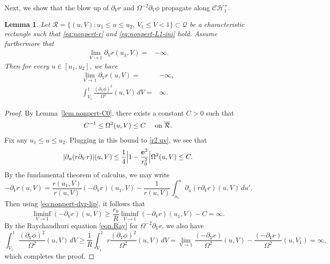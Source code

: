 \documentclass[10pt, reqno]{amsart}
\newtheorem{lemma}[theorem]{Lemma}
\theoremstyle{definition}
\theoremstyle{remark}
\numberwithin{equation}{section}
\newcommand{\abs}[1]{\vert#1\vert}
\newcommand{\set}[1]{\{#1\}}
\newcommand{\ud}{d}
\newcommand{\rd}{\partial}
\newcommand{\bb}{\Big}
\newcommand{\0}{\emptyset}
\newcommand{\Omg}{\Omega}
\newcommand{\bfe}{{\bf e}}
\newcommand{\calC}{\mathcal C}
\newcommand{\calH}{\mathcal H}
\newcommand{\calQ}{\mathcal Q}
\newcommand{\calR}{\mathcal R}
\newcommand{\CH}{\calC \calH^{+}}		%
\begin{document}
Next, we show that the blow up of $\rd_{V} r$ and $\Omg^{-2} \rd_{V} \phi$ propagate along $\CH_{1}$.
\begin{lemma} \label{lem.nonpert-blowup}
Let $\calR = \set{(u, V) : u_{1} \leq u \leq u_{2}, \ V_{1} \leq V < 1} \subset \calQ$ be a characteristic rectangle such that \eqref{eq:nonpert-r} and \eqref{eq:nonpert-L1-ini} hold. Assume furthermore that
\begin{align*}
	\lim_{V \to 1} \rd_{V} r(u_{1}, V) =& -\infty.
\end{align*}
Then for every $u \in [u_{1}, u_{2}]$, we have
\begin{align*}
	\lim_{V \to 1} \rd_{V} r(u, V) =& -\infty, \\
	\int_{V_{1}}^{1} \frac{(\rd_{V} \phi)^{2}}{\Omg^{2}}(u, V) \, d V =& \infty.
\end{align*}
\end{lemma}
\begin{proof}
By Lemma~\ref{lem.nonpert-C0}, there exists a constant $C > 0$ such that
\begin{equation*}
	C^{-1} \leq \Omg^{2}(u, V) \leq C \quad \hbox{ on } \overline{\mathcal R}.
\end{equation*}
Fix any $u_{1} \leq u \leq u_{2}$. Plugging in this bound to \eqref{r2.uv}, we see that
\begin{equation} \label{eq:nonpert-dvr-lip}
\abs{\rd_{u} (r \rd_{V} r)}(u, V)
\leq \frac{1}{4} \bb| 1 - \frac{\bfe^{2}}{r_{0}^{2}} \bb| \Omg^{2}(u, V) \leq C.
\end{equation}
By the fundamental theorem of calculus, we may write
\begin{equation*}
	- \rd_{V} r(u, V) = \frac{r(u_{1}, V)}{r(u, V)} (- \rd_{V} r) (u_{1}, V) - \frac{1}{r(u, V)} \int_{u_{1}}^{u} \rd_{u} (r \rd_{V} r) (u, V) \, \ud u'.
\end{equation*}
Then using \eqref{eq:nonpert-dvr-lip}, it follows that
\begin{equation*}
	\liminf_{V \to 1} (- \rd_{V} r)(u, V)
	\geq \frac{r_{0}}{R}  \liminf_{V \to 1} (- \rd_{V} r)(u_{1}, V) - C = \infty.
\end{equation*}
By the Raychaudhuri equation \eqref{eqn.Ray} for $\Omg^{-2} \rd_{V} r$, we also have
\begin{equation*}
	\int_{V_{1}}^{1} \frac{(\rd_{V} \phi)^{2}}{\Omg^{2}}(u, V) \, \ud V
	\geq \frac{1}{R} \int_{V_{1}}^{1} r \frac{(\rd_{V} \phi)^{2}}{\Omg^{2}}(u, V) \, \ud V
	= \lim_{V \to 1} \frac{(-\rd_{V} r)}{\Omg^{2}}(u, V) - \frac{(-\rd_{V} r)}{\Omg^{2}}(u, V_{1}) = \infty,
\end{equation*}
which completes the proof. \qedhere
\end{proof}
\end{document}
